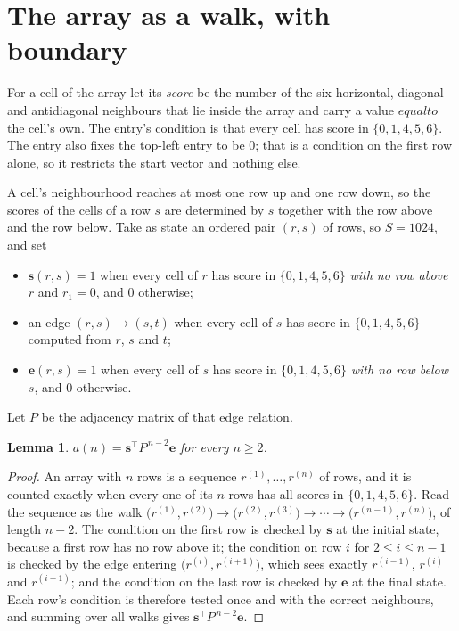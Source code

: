 \documentclass[11pt,a4paper]{article}
\theoremstyle{plain}
\newtheorem{lemma}[theorem]{Lemma}
\theoremstyle{definition}
\begin{document}
\section{The array as a walk, with boundary}

For a cell of the array let its \emph{score} be the number of the six horizontal, diagonal and antidiagonal neighbours that lie inside
the array and carry a value $equal to$ the cell's own. The entry's condition is that every cell
has score in $\{0,1,4,5,6\}$. The entry also fixes the top-left entry to be $0$; that is a condition on the first row alone, so it restricts the start vector and nothing else.

A cell's neighbourhood reaches at most one row up and one row down, so the scores of the
cells of a row $s$ are determined by $s$ together with the row above and the row below.
Take as state an ordered pair $(r,s)$ of rows, so $S=1024$, and set
\begin{itemize}
\item $\mathbf{s}(r,s)=1$ when every cell of $r$ has score in $\{0,1,4,5,6\}$ \emph{with no row
above $r$} and $r_1=0$, and $0$ otherwise;
\item an edge $(r,s)\to(s,t)$ when every cell of $s$ has score in $\{0,1,4,5,6\}$ computed from
$r$, $s$ and $t$;
\item $\mathbf{e}(r,s)=1$ when every cell of $s$ has score in $\{0,1,4,5,6\}$ \emph{with no row
below $s$}, and $0$ otherwise.
\end{itemize}
Let $P$ be the adjacency matrix of that edge relation.

\begin{lemma}\label{lem:walk}
$a(n)=\mathbf{s}^{\!\top}P^{\,n-2}\mathbf{e}$ for every $n\ge2$.
\end{lemma}

\begin{proof}
An array with $n$ rows is a sequence $r^{(1)},\dots,r^{(n)}$ of rows, and it is counted
exactly when every one of its $n$ rows has all scores in $\{0,1,4,5,6\}$. Read the sequence as the
walk $\bigl(r^{(1)},r^{(2)}\bigr)\to\bigl(r^{(2)},r^{(3)}\bigr)\to\cdots\to
\bigl(r^{(n-1)},r^{(n)}\bigr)$, of length $n-2$. The condition on the first row is
checked by $\mathbf{s}$ at the initial state, because a first row has no row above it; the
condition on row $i$ for $2\le i\le n-1$ is checked by the edge entering
$\bigl(r^{(i)},r^{(i+1)}\bigr)$, which sees exactly $r^{(i-1)}$, $r^{(i)}$ and
$r^{(i+1)}$; and the condition on the last row is checked by $\mathbf{e}$ at the final
state. Each row's condition is therefore tested once and with the correct neighbours, and
summing over all walks gives $\mathbf{s}^{\!\top}P^{\,n-2}\mathbf{e}$.
\end{proof}
\end{document}
